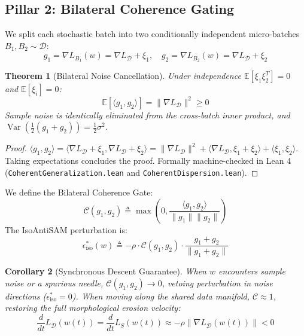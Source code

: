 \documentclass[11pt,a4paper]{article}
\newtheorem{theorem}{Theorem}
\newtheorem{corollary}[theorem]{Corollary}
\begin{document}
\subsection{Pillar 2: Bilateral Coherence Gating}
We split each stochastic batch into two conditionally independent micro-batches $B_1, B_2 \sim \mathcal{D}$:
\begin{equation}
g_1 = \nabla L_{B_1}(w) = \nabla L_{\mathcal{D}} + \xi_1, \quad g_2 = \nabla L_{B_2}(w) = \nabla L_{\mathcal{D}} + \xi_2
\end{equation}

\begin{theorem}[Bilateral Noise Cancellation]
Under independence $\mathbb{E}[\xi_1 \xi_2^T] = 0$ and $\mathbb{E}[\xi_i] = 0$:
\begin{equation}
\mathbb{E}[\langle g_1, g_2 \rangle] = \|\nabla L_{\mathcal{D}}\|^2 \ge 0
\end{equation}
Sample noise is identically eliminated from the cross-batch inner product, and $\operatorname{Var}(\frac{1}{2}(g_1 + g_2)) = \frac{1}{2}\sigma^2$.
\end{theorem}
\begin{proof}
$\langle g_1, g_2 \rangle = \langle \nabla L_{\mathcal{D}} + \xi_1, \nabla L_{\mathcal{D}} + \xi_2 \rangle = \|\nabla L_{\mathcal{D}}\|^2 + \langle \nabla L_{\mathcal{D}}, \xi_1 + \xi_2 \rangle + \langle \xi_1, \xi_2 \rangle$. Taking expectations concludes the proof. Formally machine-checked in Lean 4 (\texttt{CoherentGeneralization.lean} and \texttt{CoherentDispersion.lean}).
\end{proof}

We define the Bilateral Coherence Gate:
\begin{equation}
\mathcal{C}(g_1, g_2) \triangleq \max\left(0, \frac{\langle g_1, g_2 \rangle}{\|g_1\| \|g_2\|}\right)
\end{equation}
The IsoAntiSAM perturbation is:
\begin{equation}
\epsilon_{\text{iso}}^*(w) \triangleq -\rho \cdot \mathcal{C}(g_1, g_2) \cdot \frac{g_1 + g_2}{\|g_1 + g_2\|}
\end{equation}

\begin{corollary}[Synchronous Descent Guarantee]
When $w$ encounters sample noise or a spurious needle, $\mathcal{C}(g_1, g_2) \to 0$, vetoing perturbation in noise directions ($\epsilon_{\text{iso}}^* = 0$). When moving along the shared data manifold, $\mathcal{C} \approx 1$, restoring the full morphological erosion velocity:
\begin{equation}
\frac{d}{dt} L_{\mathcal{D}}(w(t)) = \frac{d}{dt} L_S(w(t)) \approx -\rho \|\nabla L_{\mathcal{D}}(w(t))\| < 0
\end{equation}
\end{corollary}
\end{document}
